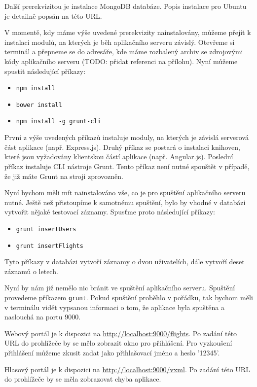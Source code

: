 \documentclass[ing,male,java,dept460]{diploma}						%
\begin{document}
Další prerekvizitou je instalace MongoDB databáze. Popis instalace pro Ubuntu je detailně popsán na této URL\cite{Mongo_install}.

V momentě, kdy máme výše uvedené prerekvizity nainstalovány, můžeme přejít k instalaci modulů, na kterých je běh aplikačního serveru závislý. Otevřeme si terminál a přepneme se do adresáře, kde máme rozbalený archiv se zdrojovými kódy aplikačního serveru (TODO: přidat referenci na přílohu). Nyní můžeme spustit následující příkazy:

\begin{itemize}
\item \texttt{npm install}
\item \texttt{bower install}
\item \texttt{npm install -g grunt-cli}
\end{itemize}

První z výše uvedených příkazů instaluje moduly, na kterých je závislá serverová část aplikace (např. Express.js). Druhý příkaz se postará o instalaci knihoven, které jsou vyžadovány klientskou částí aplikace (např. Angular.js). Poslední příkaz instaluje CLI nástroje Grunt. Tento příkaz není nutné spouštět v případě, že již máte Grunt na stroji zprovozněn.

Nyní bychom měli mít nainstalováno vše, co je pro spuštění aplikačního serveru nutné. Ještě než přistoupíme k samotnému spuštění, bylo by vhodné v databázi vytvořit nějaké testovací záznamy. Spusťme proto následující příkazy:

\begin{itemize}
\item \texttt{grunt insertUsers}
\item \texttt{grunt insertFlights}
\end{itemize}

Tyto příkazy v databázi vytvoří záznamy o dvou uživatelích, dále vytvoří deset záznamů o letech.

Nyní by nám již nemělo nic bránit ve spuštění aplikačního serveru. Spuštění provedeme příkazem \texttt{grunt}. Pokud spuštění proběhlo v pořádku, tak bychom měli v terminálu vidět vypsanou informaci o tom, že aplikace byla spuštěna a naslouchá na portu 9000.

Webový portál je k dispozici na \url{http://localhost:9000/flights}. Po zadání této URL do prohlížeče by se mělo zobrazit okno pro přihlášení. Pro vyzkoušení přihlášení můžeme zkusit zadat jako přihlašovací jméno a heslo '12345'.

Hlasový portál je k dispozici na \url{http://localhost:9000/vxml}. Po zadání této URL do prohlížeče by se měla zobrazovat chyba aplikace.
\end{document}

